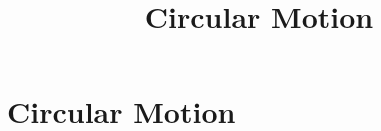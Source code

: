 \documentclass[aspectratio=169,
hyperref={colorlinks,urlcolor=blue}
]{beamer}
\begin{document}












\section{Circular Motion}
\label{sec:circularmotion}
\title{Circular Motion}
\author{\insertsubsection}


\begin{frame}
\titlepage
\thispagestyle{empty}
\end{frame}
















\end{document}

